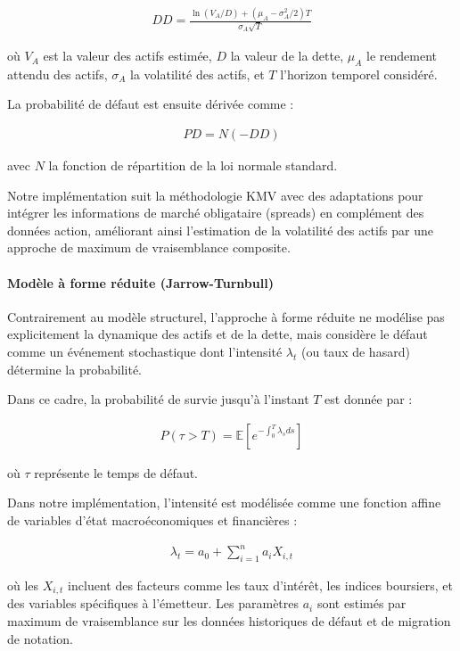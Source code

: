 \begin{align}
DD = \frac{\ln(V_A/D) + (\mu_A - \sigma_A^2/2)T}{\sigma_A\sqrt{T}}
\end{align}

où $V_A$ est la valeur des actifs estimée, $D$ la valeur de la dette, $\mu_A$ le rendement attendu des actifs, $\sigma_A$ la volatilité des actifs, et $T$ l'horizon temporel considéré.

La probabilité de défaut est ensuite dérivée comme :

\begin{align}
PD = N(-DD)
\end{align}

avec $N$ la fonction de répartition de la loi normale standard.

Notre implémentation suit la méthodologie KMV avec des adaptations pour intégrer les informations de marché obligataire (spreads) en complément des données action, améliorant ainsi l'estimation de la volatilité des actifs par une approche de maximum de vraisemblance composite.

\paragraph{Modèle à forme réduite (Jarrow-Turnbull)} Contrairement au modèle structurel, l'approche à forme réduite ne modélise pas explicitement la dynamique des actifs et de la dette, mais considère le défaut comme un événement stochastique dont l'intensité $\lambda_t$ (ou taux de hasard) détermine la probabilité.

Dans ce cadre, la probabilité de survie jusqu'à l'instant $T$ est donnée par :

\begin{align}
P(\tau > T) = \mathbb{E}\left[e^{-\int_0^T \lambda_s ds}\right]
\end{align}

où $\tau$ représente le temps de défaut.

Dans notre implémentation, l'intensité est modélisée comme une fonction affine de variables d'état macroéconomiques et financières :

\begin{align}
\lambda_t = a_0 + \sum_{i=1}^n a_i X_{i,t}
\end{align}

où les $X_{i,t}$ incluent des facteurs comme les taux d'intérêt, les indices boursiers, et des variables spécifiques à l'émetteur. Les paramètres $a_i$ sont estimés par maximum de vraisemblance sur les données historiques de défaut et de migration de notation.

